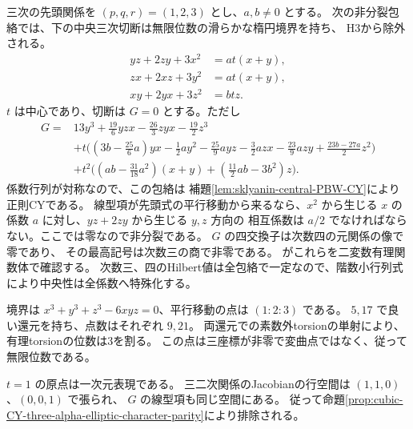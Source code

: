 \begin{example}\label{ex:cubic-CY-three-alpha-elliptic-character-obstruction}
三次の先頭関係を $(p,q,r)=(1,2,3)$ とし、$a,b\ne0$ とする。
次の非分裂包絡では、下の中央三次切断は無限位数の滑らかな楕円境界を持ち、
H3から除外される。
\[
\begin{aligned}
 yz+2zy+3x^2&=at(x+y),\\
 zx+2xz+3y^2&=at(x+y),\\
 xy+2yx+3z^2&=btz .
\end{aligned}
\]
$t$ は中心であり、切断は $G=0$ とする。ただし
\[
\begin{aligned}
 G={}&13y^3+\tfrac{19}{6}yzx-\tfrac{26}{3}zyx-\tfrac{19}{2}z^3\\
 &+t\bigl((3b-\tfrac{25}{6}a)yx-\tfrac12ay^2-\tfrac{25}{9}ayz
        -\tfrac32azx-\tfrac{23}{9}azy+\tfrac{23b-27a}{2}z^2\bigr)\\
 &+t^2\bigl((ab-\tfrac{31}{18}a^2)(x+y)
              +(\tfrac{11}{2}ab-3b^2)z\bigr).
\end{aligned}
\]
係数行列が対称なので、この包絡は
補題\ref{lem:sklyanin-central-PBW-CY}により正則CYである。
線型項が先頭式の平行移動から来るなら、$x^2$ から生じる
$x$ の係数 $a$ に対し、$yz+2zy$ から生じる $y,z$ 方向の
相互係数は $a/2$ でなければならない。ここでは零なので非分裂である。
$G$ の四交換子は次数四の元関係の像で零であり、
その最高記号は次数三の商で非零である。
がこれらを二変数有理関数体で確認する。
次数三、四のHilbert値は全包絡で一定なので、階数小行列式により中央性は全係数へ特殊化する。

境界は $x^3+y^3+z^3-6xyz=0$、平行移動の点は $(1:2:3)$ である。
$5,17$ で良い還元を持ち、点数はそれぞれ $9,21$。
両還元での素数外torsionの単射により、有理torsionの位数は3を割る。
この点は三座標が非零で変曲点ではなく、従って無限位数である。

$t=1$ の原点は一次元表現である。
三二次関係のJacobianの行空間は $(1,1,0)$、$(0,0,1)$ で張られ、
$G$ の線型項も同じ空間にある。
従って命題\ref{prop:cubic-CY-three-alpha-elliptic-character-parity}により排除される。
\end{example}

